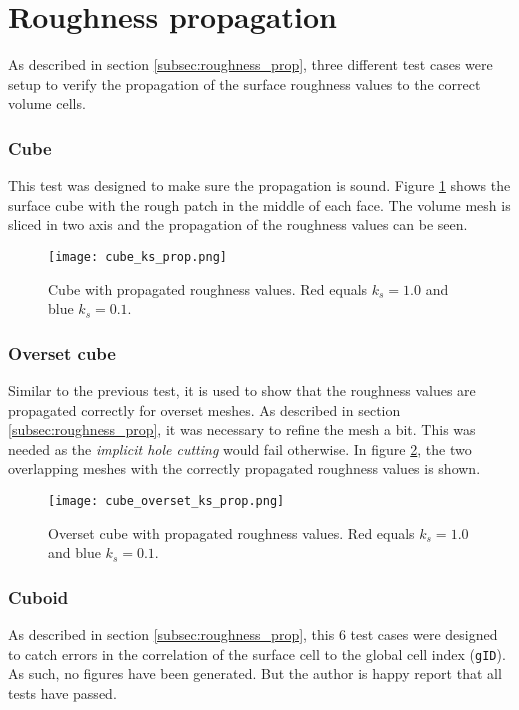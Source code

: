 \section{Roughness propagation}
As described in section \ref{subsec:roughness_prop}, three different test cases
were setup to verify the propagation of the surface roughness values to the
correct volume cells.

\subsubsection{Cube}
This test was designed to make sure the propagation is sound. Figure
\ref{fig:cube_ks_prop} shows the surface cube with the rough patch in the middle
of each face. The volume mesh is sliced in two axis and the propagation of the
roughness values can be seen.

\begin{figure}[H] \centering
\texttt{[image: cube\_ks\_prop.png]}
    \caption{Cube with propagated roughness values. Red equals
$k_{s} = 1.0$ and blue $k_{s} = 0.1$.}
    \label{fig:cube_ks_prop}
\end{figure}

\subsubsection{Overset cube}
Similar to the previous test, it is used to show that the roughness values are
propagated correctly for  overset meshes. As described in section
\ref{subsec:roughness_prop}, it was necessary to refine the mesh a bit. This was
needed as the \textit{implicit hole cutting} would fail otherwise. In figure
\ref{fig:cube_overset_ks_prop}, the two overlapping meshes with the correctly
propagated roughness values is shown.

\begin{figure}[H] \centering
\texttt{[image: cube\_overset\_ks\_prop.png]}
    \caption{Overset cube with propagated roughness values. Red equals
$k_{s} = 1.0$ and blue $k_{s} = 0.1$.}
    \label{fig:cube_overset_ks_prop}
\end{figure}

\subsubsection{Cuboid}
As described in section \ref{subsec:roughness_prop}, this 6 test cases were
designed to catch errors in the correlation of the surface cell to the global
cell index (\texttt{gID}). As such, no figures have been generated. But the
author is happy report that all tests have passed.

